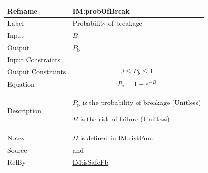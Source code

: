 \documentclass[12pt]{article}
\begin{document}
\medskip
\noindent
\begin{minipage}{\textwidth}
\begin{tabular}{>{\raggedright}p{}>{\raggedright\arraybackslash}p{}}
\toprule \textbf{Refname} & \textbf{IM:probOfBreak}
\label{IM:probOfBreak}
\\ \midrule
Label & Probability of breakage
        
\\ \midrule
Input & $B$
        
\\ \midrule
Output & ${P_{\text{b}}}$
         
\\ \midrule
Input Constraints & 
\\ \midrule
Output Constraints & \begin{displaymath}
                     0\leq{}{P_{\text{b}}}\leq{}1
                     \end{displaymath}
\\ \midrule
Equation & \begin{displaymath}
           {P_{\text{b}}}=1-e^{-B}
           \end{displaymath}
\\ \midrule
Description & \begin{symbDescription}
              \item{${P_{\text{b}}}$ is the probability of breakage (Unitless)}
              \item{$B$ is the risk of failure (Unitless)}
              \end{symbDescription}
\\ \midrule
Notes & $B$ is defined in \hyperref[IM:riskFun]{IM:riskFun}.
        
\\ \midrule
Source & \cite{astm2009} and \cite{beasonEtAl1998}
         
\\ \midrule
RefBy & \hyperref[IM:isSafePb]{IM:isSafePb}
        
\\ \bottomrule
\end{tabular}
\end{minipage}
\end{document}
